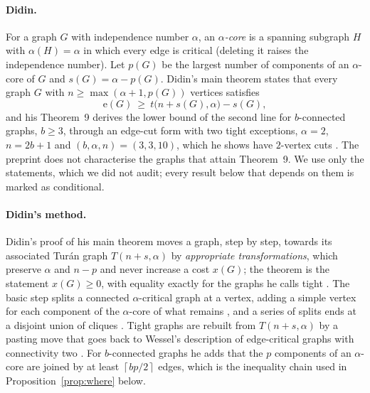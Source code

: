 \documentclass[11pt]{article}
\theoremstyle{definition}
\theoremstyle{remark}
\newcommand{\e}{\mathrm{e}}
\newcommand{\ceil}[1]{\left\lceil #1\right\rceil}
\begin{document}
\paragraph{Didin.} For a graph $G$ with independence number $\alpha$, an \emph{$\alpha$-core} is a spanning subgraph
$H$ with $\alpha(H)=\alpha$ in which every edge is critical (deleting it raises the independence number). Let $p(G)$
be the largest number of components of an $\alpha$-core of $G$ and $s(G)=\alpha-p(G)$. Didin's main theorem
\cite[Theorem~3]{Didin} states that every graph $G$ with $n\ge\max(\alpha+1,p(G))$ vertices satisfies
\begin{equation}\label{eq:didin}
\e(G)\ \ge\ t\bigl(n+s(G),\alpha\bigr)-s(G),
\end{equation}
and his Theorem~9 derives the lower bound of the second line for $b$-connected graphs, $b\ge3$, through an edge-cut
form with two tight exceptions, $\alpha=2$, $n=2b+1$ and $(b,\alpha,n)=(3,3,10)$, which he shows have $2$-vertex cuts
\cite[Theorem~10, Lemmas~17 and~18]{Didin}. The preprint does not characterise the graphs that attain Theorem~9.
We use only the statements, which we did not audit; every result below that depends on them is marked as conditional.

\paragraph{Didin's method.} Didin's proof of his main theorem moves a graph, step by step, towards its associated
Tur\'an graph $T(n+s,\alpha)$ by \emph{appropriate transformations}, which preserve $\alpha$ and $n-p$ and never
increase a cost $x(G)$; the theorem is the statement $x(G)\ge0$, with equality exactly for the graphs he calls tight
\cite[Theorem~3]{Didin}. The basic step splits a connected $\alpha$-critical graph at a vertex, adding a simple vertex
for each component of the $\alpha$-core of what remains \cite[Theorem~5]{Didin}, and a series of splits ends at a
disjoint union of cliques \cite[Lemma~1]{Didin}. Tight graphs are rebuilt from $T(n+s,\alpha)$ by a pasting move
\cite[Lemma~2]{Didin} that goes back to Wessel's description of edge-critical graphs with connectivity two
\cite{Wessel}. For $b$-connected graphs he adds that the $p$ components of an $\alpha$-core are joined by at least
$\ceil{bp/2}$ edges, which is the inequality chain used in Proposition~\ref{prop:where} below.
\end{document}
